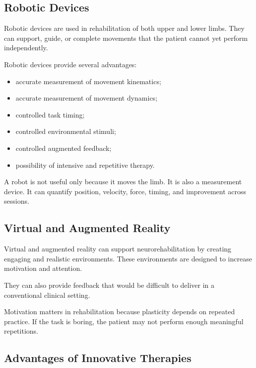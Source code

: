 \subsection{Robotic Devices}

Robotic devices are used in rehabilitation of both upper and lower limbs. They can support, guide, or complete movements that the patient cannot yet perform independently.

Robotic devices provide several advantages:

\begin{itemize}[noitemsep]
    \item accurate measurement of movement kinematics;
    \item accurate measurement of movement dynamics;
    \item controlled task timing;
    \item controlled environmental stimuli;
    \item controlled augmented feedback;
    \item possibility of intensive and repetitive therapy.
\end{itemize}

\begin{authornote}
A robot is not useful only because it moves the limb. It is also a measurement device. It can quantify position, velocity, force, timing, and improvement across sessions.
\end{authornote}

\subsection{Virtual and Augmented Reality}

Virtual and augmented reality can support neurorehabilitation by creating engaging and realistic environments. These environments are designed to increase motivation and attention.

They can also provide feedback that would be difficult to deliver in a conventional clinical setting.

\begin{authornote}
Motivation matters in rehabilitation because plasticity depends on repeated practice. If the task is boring, the patient may not perform enough meaningful repetitions.
\end{authornote}

\subsection{Advantages of Innovative Therapies}


